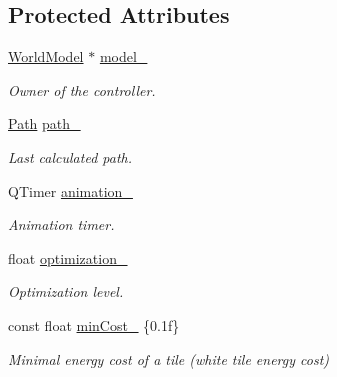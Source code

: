 \subsection*{Protected Attributes}
\begin{DoxyCompactItemize}
\item 
\hyperlink{classWorldModel}{World\+Model} $\ast$ \hyperlink{classWorldAbstractController_a45fe9595cbcc1eafe6f3f418a08f46c4}{model\+\_\+}\hypertarget{classWorldAbstractController_a45fe9595cbcc1eafe6f3f418a08f46c4}{}\label{classWorldAbstractController_a45fe9595cbcc1eafe6f3f418a08f46c4}

\begin{DoxyCompactList}\small\item\em Owner of the controller. \end{DoxyCompactList}\item 
\hyperlink{structPath}{Path} \hyperlink{classWorldAbstractController_a8e42846e0e46245149339a79758c8a4b}{path\+\_\+}\hypertarget{classWorldAbstractController_a8e42846e0e46245149339a79758c8a4b}{}\label{classWorldAbstractController_a8e42846e0e46245149339a79758c8a4b}

\begin{DoxyCompactList}\small\item\em Last calculated path. \end{DoxyCompactList}\item 
Q\+Timer \hyperlink{classWorldAbstractController_ad152162c39be7f44e48f5ab2de7fcafa}{animation\+\_\+}\hypertarget{classWorldAbstractController_ad152162c39be7f44e48f5ab2de7fcafa}{}\label{classWorldAbstractController_ad152162c39be7f44e48f5ab2de7fcafa}

\begin{DoxyCompactList}\small\item\em Animation timer. \end{DoxyCompactList}\item 
float \hyperlink{classWorldAbstractController_abaf4fb0106d4f5ee475b609a1b3116dd}{optimization\+\_\+}\hypertarget{classWorldAbstractController_abaf4fb0106d4f5ee475b609a1b3116dd}{}\label{classWorldAbstractController_abaf4fb0106d4f5ee475b609a1b3116dd}

\begin{DoxyCompactList}\small\item\em Optimization level. \end{DoxyCompactList}\item 
const float \hyperlink{classWorldAbstractController_a4064e89beaf84bbaf8c018058c821c8a}{min\+Cost\+\_\+} \{0.\+1f\}
\begin{DoxyCompactList}\small\item\em Minimal energy cost of a tile (white tile energy cost) \end{DoxyCompactList}\end{DoxyCompactItemize}



